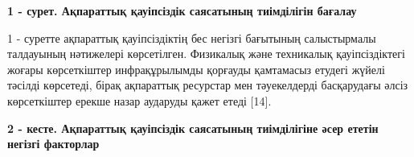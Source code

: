 {\bfseries 1 - сурет. Ақпараттық қауіпсіздік саясатының тиімділігін бағалау}

1 - суретте ақпараттық қауіпсіздіктің бес негізгі бағытының салыстырмалы
талдауының нәтижелері көрсетілген. Физикалық және техникалық
қауіпсіздіктегі жоғары көрсеткіштер инфрақұрылымды қорғауды қамтамасыз
етудегі жүйелі тәсілді көрсетеді, бірақ ақпараттық ресурстар мен
тәуекелдерді басқарудағы әлсіз көрсеткіштер ерекше назар аударуды қажет
етеді {[}14{]}.

{\bfseries 2 - кесте. Ақпараттық қауіпсіздік саясатының тиімділігіне әсер
ететін негізгі факторлар}

